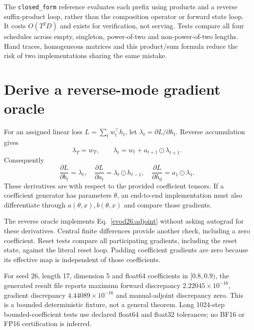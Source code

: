 The \texttt{closed\_form} reference evaluates each prefix using products and a
reverse suffix-product loop, rather than the composition operator or forward state
loop. It costs $O(T^2D)$ and exists for verification, not serving.
Tests compare all four schedules across empty, singleton, power-of-two and
non-power-of-two lengths. Hand traces, homogeneous matrices and this product/sum
formula reduce the risk of two implementations sharing the same mistake.

\section{Derive a reverse-mode gradient oracle}
For an assigned linear loss $L=\sum_t w_t^\top h_t$, let
$\lambda_t=\partial L/\partial h_t$. Reverse accumulation gives
\[
\lambda_T=w_T,\qquad
\lambda_t=w_t+a_{t+1}\odot\lambda_{t+1}.
\]
Consequently
\begin{equation}
\frac{\partial L}{\partial b_t}=\lambda_t,\quad
\frac{\partial L}{\partial a_t}=\lambda_t\odot h_{t-1},\quad
\frac{\partial L}{\partial h_0}=a_1\odot\lambda_1.
\label{evod26:adjoint}
\end{equation}
These derivatives are with respect to the provided coefficient tensors. If a
coefficient generator has parameters $\theta$, an end-to-end implementation must
also differentiate through $a(\theta,x),b(\theta,x)$ and compare those gradients.

The reverse oracle implements Eq.~\ref{evod26:adjoint} without asking autograd for
these derivatives. Central finite differences provide another check, including
a zero coefficient. Reset tests compare all participating gradients, including
the reset state, against the literal reset loop. Padding coefficient gradients
are zero because its effective map is independent of those coefficients.

For seed 26, length 17, dimension 5 and float64 coefficients in $[0.8,0.9)$,
the generated result file reports maximum forward discrepancy $2.22045\times10^{-16}$,
gradient discrepancy $4.44089\times10^{-16}$ and manual-adjoint discrepancy zero.
This is a bounded deterministic fixture, not a
general theorem. Long 1024-step bounded-coefficient tests use declared float64
and float32 tolerances; no BF16 or FP16 certification is inferred.

